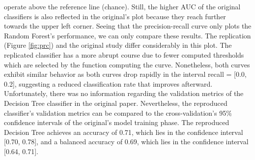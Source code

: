 operate above the reference line (chance). Still, the higher AUC of the 
original classifiers is also reflected in the original's plot because they 
reach further 
towards the upper left corner. Seeing that the precision-recall curve only 
plots the 
Random Forest's performance, we can only compare these results. The replication 
(Figure \ref{fig:prc}) and the original study differ considerably in this plot. 
The replicated classifier has a more abrupt course due to fewer 
computed thresholds which are selected by the function computing the curve. 
Nonetheless, both curves exhibit similar behavior as both 
curves drop rapidly in the interval recall = [0.0, 0.2], suggesting a reduced 
classification rate that improves afterward. Unfortunately, there was no 
information regarding the validation metrics of the Decision Tree classifier 
in the original paper. 
Nevertheless,  the reproduced classifier's validation metrics can be compared 
to the cross-validation's 95\% confidence intervals of the original's model 
training phase.
The reproduced Decision Tree achieves an accuracy of 0.71, which lies in the 
confidence interval [0.70, 0.78], and a balanced accuracy of 0.69, which lies 
in the confidence interval [0.64, 0.71].
